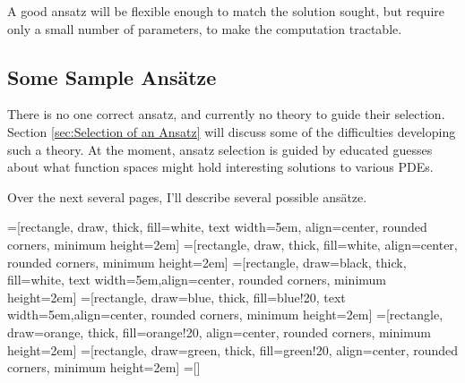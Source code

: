 \documentclass{article}
\theoremstyle{definition}
\theoremstyle{plain}
\begin{document}
A good ansatz will be flexible enough to match the solution sought, but require only a small number
of parameters, to make the computation tractable.

\subsection{Some Sample Ans\"atze}

There is no one correct ansatz, and currently no theory to guide their selection.
Section \ref{sec:Selection of an Ansatz} will discuss some of the difficulties
developing such a theory.
At the moment, ansatz selection is guided by educated guesses about what
function spaces might hold interesting solutions to various PDEs.

Over the next several pages, I'll describe several possible ans\"atze.

=[rectangle, draw, thick, fill=white, text width=5em, align=center, rounded corners, minimum height=2em]
=[rectangle, draw, thick, fill=white, align=center, rounded corners, minimum height=2em]
=[rectangle, draw=black, thick, fill=white, text width=5em,align=center, rounded corners, minimum height=2em]
=[rectangle, draw=blue, thick, fill=blue!20, text width=5em,align=center, rounded corners, minimum height=2em]
=[rectangle, draw=orange, thick, fill=orange!20, align=center, rounded corners, minimum height=2em]
=[rectangle, draw=green, thick, fill=green!20, align=center, rounded corners, minimum height=2em]
=[]
\end{document}
